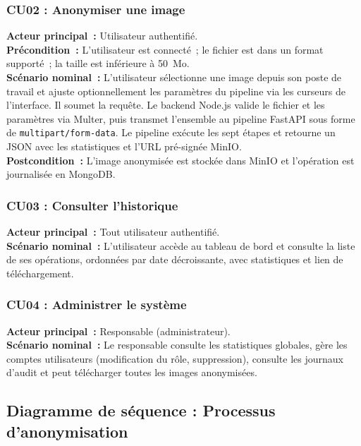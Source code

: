 \subsubsection{CU02 : Anonymiser une image}

\textbf{Acteur principal~:} Utilisateur authentifié.\\
\textbf{Précondition~:} L'utilisateur est connecté~; le fichier est dans un format supporté~; la taille est inférieure à 50~Mo.\\
\textbf{Scénario nominal~:} L'utilisateur sélectionne une image depuis son poste de travail et ajuste optionnellement les paramètres du pipeline via les curseurs de l'interface. Il soumet la requête. Le backend Node.js valide le fichier et les paramètres via Multer, puis transmet l'ensemble au pipeline FastAPI sous forme de \texttt{multipart/form-data}. Le pipeline exécute les sept étapes et retourne un JSON avec les statistiques et l'URL pré-signée MinIO.\\
\textbf{Postcondition~:} L'image anonymisée est stockée dans MinIO et l'opération est journalisée en MongoDB.

\subsubsection{CU03 : Consulter l'historique}

\textbf{Acteur principal~:} Tout utilisateur authentifié.\\
\textbf{Scénario nominal~:} L'utilisateur accède au tableau de bord et consulte la liste de ses opérations, ordonnées par date décroissante, avec statistiques et lien de téléchargement.

\subsubsection{CU04 : Administrer le système}

\textbf{Acteur principal~:} Responsable (administrateur).\\
\textbf{Scénario nominal~:} Le responsable consulte les statistiques globales, gère les comptes utilisateurs (modification du rôle, suppression), consulte les journaux d'audit et peut télécharger toutes les images anonymisées.

\subsection{Diagramme de séquence : Processus d'anonymisation}

